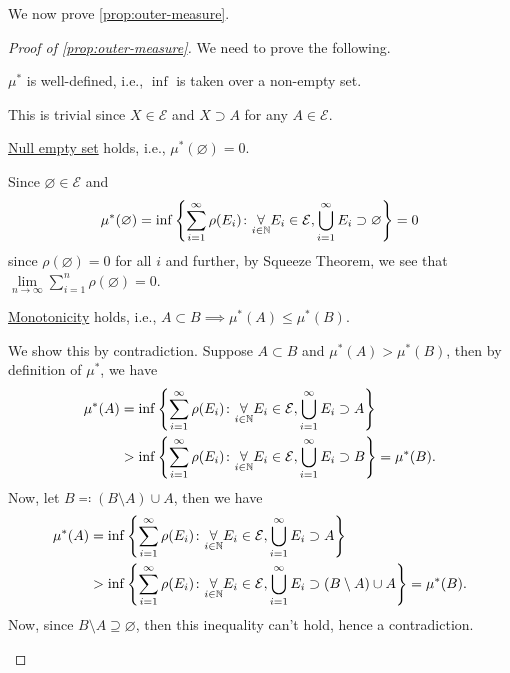 We now prove \autoref{prop:outer-measure}.
\begin{proof}[Proof of \autoref{prop:outer-measure}]
	We need to prove the following.

	\begin{claim}
		\(\mu ^{\ast} \) is well-defined, i.e., \(\inf\) is taken over a non-empty set.
	\end{claim}
	\begin{explanation}
		This is trivial since \(X\in \mathcal{E}\) and \(X\supset A\) for any \(A\in \mathcal{E}\).
	\end{explanation}

	\begin{claim}
		\hyperref[def:outer-measure-null-empty-set]{Null empty set} holds, i.e., \(\mu ^{\ast} (\varnothing ) = 0\).
	\end{claim}
	\begin{explanation}
		Since \(\varnothing \in \mathcal{E}\) and
		\[
			\mu^{\ast} (\varnothing ) = \inf \left\{\sum\limits_{i=1}^{\infty} \rho(E_{i})\colon \underset{i\in \mathbb{\MakeUppercase{N}} }{\forall}E_{i}\in \mathcal{E} , \bigcup\limits_{i=1}^{\infty} E_{i}\supset \varnothing \right\} = 0
		\]
		since \(\rho(\varnothing ) = 0\) for all \(i\) and further, by Squeeze Theorem, we see that \(\lim\limits_{n \to \infty} \sum\limits_{i=1}^{n} \rho(\varnothing) = 0\).
	\end{explanation}

	\begin{claim}
		\hyperref[def:outer-measure-montonicity]{Monotonicity} holds, i.e., \(A\subset B\implies \mu^{\ast} (A)\leq \mu^{\ast} (B)\).
	\end{claim}
	\begin{explanation}
		We show this by contradiction. Suppose \(A\subset B\) and \(\mu^{\ast} (A)>  \mu^{\ast} (B)\), then by
		definition of \(\mu^{\ast} \), we have
		\[
			\begin{split}
				\mu^{\ast} (A) &= \inf\left\{\sum\limits_{i=1}^{\infty} \rho(E_{i})\colon \underset{i\in\mathbb{\MakeUppercase{N}}}{\forall}E_{i}\in \mathcal{E},\bigcup\limits_{i=1}^{\infty} E_{i}\supset A \right\}\\
				&>\inf\left\{\sum\limits_{i=1}^{\infty} \rho(E_{i})\colon \underset{i\in\mathbb{\MakeUppercase{N}}}{\forall}E_{i}\in \mathcal{E},\bigcup\limits_{i=1}^{\infty} E_{i}\supset B \right\} = \mu^{\ast} (B).
			\end{split}
		\]
		Now, let \(B \eqqcolon (B\setminus A)\cup A\), then we have
		\[
			\begin{split}
				\mu^{\ast} (A) &= \inf\left\{\sum\limits_{i=1}^{\infty} \rho(E_{i})\colon \underset{i\in\mathbb{\MakeUppercase{N}}}{\forall}E_{i}\in \mathcal{E},\bigcup\limits_{i=1}^{\infty} E_{i}\supset A \right\}\\
				&>\inf\left\{\sum\limits_{i=1}^{\infty} \rho(E_{i})\colon \underset{i\in\mathbb{\MakeUppercase{N}}}{\forall}E_{i}\in \mathcal{E},\bigcup\limits_{i=1}^{\infty} E_{i}\supset (B\setminus A)\cup A \right\} = \mu^{\ast} (B).
			\end{split}
		\]
		Now, since \(B\setminus A\supseteq \varnothing \), then this inequality can't hold, hence a contradiction\conta.
	\end{explanation}


\end{proof}
